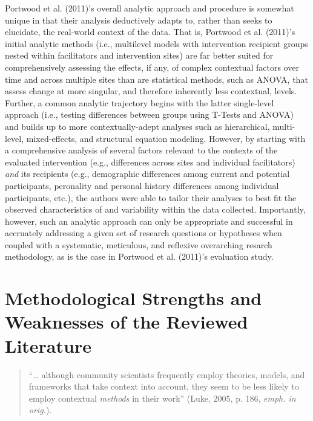 \documentclass[11pt,]{tufte-book}
\begin{document}
Portwood et al. (2011)'s overall analytic approach and procedure is
somewhat unique in that their analysis deductively adapts to, rather
than seeks to elucidate, the real-world context of the data. That is,
Portwood et al. (2011)'s initial analytic methods (i.e., multilevel
models with intervention recipient groups nested within facilitators and
intervention sites) are far better suited for comprehensively assessing
the effects, if any, of complex contextual factors over time and across
multiple sites than are statistical methods, such as ANOVA, that assess
change at more singular, and therefore inherently less contextual,
levels. Further, a common analytic trajectory begins with the latter
single-level approach (i.e., testing differences between groups using
T-Tests and ANOVA) and builds up to more contextually-adept analyses
such as hierarchical, multi-level, mixed-effects, and structural
equation modeling. However, by starting with a comprehensive analysis of
several factors relevant to the contexts of the evaluated intervention
(e.g., differences across sites and individual facilitators) \emph{and}
its recipients (e.g., demographic differences among current and
potential participants, peronality and personal history differences
among individual participants, etc.), the authors were able to tailor
their analyses to best fit the observed characteristics of and
variability within the data collected. Importantly, however, such an
analytic approach can only be appropriate and successful in accruately
addressing a given set of research questions or hypotheses when coupled
with a systematic, meticulous, and reflexive overarching resarch
methodology, as is the case in Portwood et al. (2011)'s evaluation
study.

\chapter{Methodological Strengths and Weaknesses of the Reviewed
Literature}\label{methodological-strengths-and-weaknesses-of-the-reviewed-literature}

\singlespacing

\begin{quote}
``\ldots{} although community scientists frequently employ theories,
models, and frameworks that take context into account, they seem to be
less likely to employ contextual \emph{methods} in their work'' (Luke,
2005, p. 186, \emph{emph. in orig.}).
\end{quote}

\doublespacing
\end{document}
